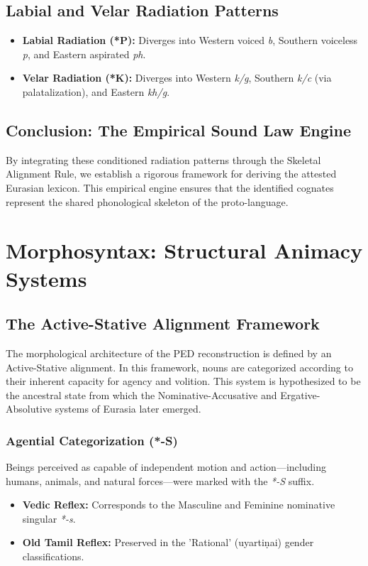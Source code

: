 \documentclass[11pt,oneside,openany]{book}
\begin{document}
\section{Labial and Velar Radiation Patterns}
\begin{itemize}
    \item \textbf{Labial Radiation (*P):} Diverges into Western voiced \textit{b}, Southern voiceless \textit{p}, and Eastern aspirated \textit{ph}.
    \item \textbf{Velar Radiation (*K):} Diverges into Western \textit{k/g}, Southern \textit{k/c} (via palatalization), and Eastern \textit{kh/g}.
\end{itemize}

\section{Conclusion: The Empirical Sound Law Engine}
By integrating these conditioned radiation patterns through the Skeletal Alignment Rule, we establish a rigorous framework for deriving the attested Eurasian lexicon. This empirical engine ensures that the identified cognates represent the shared phonological skeleton of the proto-language.


\chapter{Morphosyntax: Structural Animacy Systems}

\section{The Active-Stative Alignment Framework}
The morphological architecture of the PED reconstruction is defined by an Active-Stative alignment. In this framework, nouns are categorized according to their inherent capacity for agency and volition. This system is hypothesized to be the ancestral state from which the Nominative-Accusative and Ergative-Absolutive systems of Eurasia later emerged.

\subsection{Agential Categorization (*-S)}
Beings perceived as capable of independent motion and action—including humans, animals, and natural forces—were marked with the \textit{*-S} suffix. 
\begin{itemize}
    \item \textbf{Vedic Reflex:} Corresponds to the Masculine and Feminine nominative singular \textit{*-s}.
    \item \textbf{Old Tamil Reflex:} Preserved in the 'Rational' (uyartiṇai) gender classifications.
\end{itemize}
\end{document}
